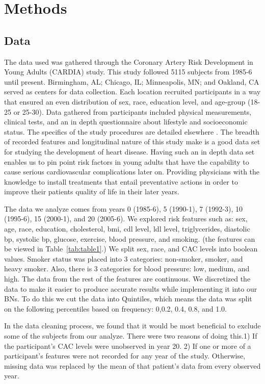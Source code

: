 \section{Methods}

\subsection{Data}

The data used was gathered through the Coronary Artery Risk Development in Young Adults (CARDIA) study. This study followed 5115 subjects from 1985-6 until present. Birmingham, AL; Chicago, IL; Minneapolis, MN; and Oakland, CA served as centers for data collection. Each location recruited participants in a way that ensured an even distribution of sex, race, education level, and age-group (18-25 or 25-30). Data gathered from participants included physical measurements, clinical tests, and an in depth questionnaire about lifestyle and socioeconomic status.  The specifics of the study procedures are detailed elsewhere \cite{Friedman1988}.  The breadth of recorded features and longitudinal nature of this study make is a good data set for studying the development of heart disease.  Having such an in depth data set enables us to pin point risk factors in young adults that have the capability to cause serious cardiovascular complications later on.  Providing physicians with the knowledge to install treatments that entail preventative actions in order to improve their patients quality of life in their later years.

The data we analyze comes from years 0 (1985-6), 5 (1990-1), 7 (1992-3), 10 (1995-6), 15 (2000-1), and 20 (2005-6).  We explored risk features such as: sex, age, race, education, cholesterol, bmi, cdl level, ldl level, triglycerides, diastolic bp, systolic bp, glucose, exercise, blood pressure, and smoking. (the features can be viewed in Table~\ref{tab:table1}.)  We split sex, race, and CAC levels into boolean values.   Smoker status was placed into 3 categories: non-smoker, smoker, and heavy smoker.  Also, there is 3 categories for blood pressure:  low, medium, and high.  The data from the rest of the features are continuous.  We discretized the data to make it easier to produce accurate results while implementing it into our BNs.  To do this we cut the data into Quintiles, which means the data was split on the following percentiles based on frequency: 0,0.2, 0.4, 0.8, and 1.0.

In the data cleaning process, we found that it would be most beneficial to exclude some of the subjects from our analyze.  There were two reasons of doing this.1) If the participant's CAC levels were unobserved in year 20. 2) If one or more of a participant's features were not recorded for any year of the study. Otherwise, missing data was replaced by the mean of that patient's data from every observed year.  


